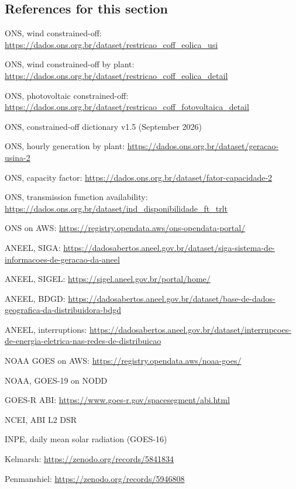 \subsection*{References for this section}
{\small
\begin{enumerate}[label={[\arabic*]},leftmargin=2.2em,itemsep=1pt]
\item ONS, wind constrained-off: \url{https://dados.ons.org.br/dataset/restricao_coff_eolica_usi}
\item ONS, wind constrained-off by plant: \url{https://dados.ons.org.br/dataset/restricao_coff_eolica_detail}
\item ONS, photovoltaic constrained-off: \url{https://dados.ons.org.br/dataset/restricao_coff_fotovoltaica_detail}
\item ONS, constrained-off dictionary v1.5 (September 2026)
\item ONS, hourly generation by plant: \url{https://dados.ons.org.br/dataset/geracao-usina-2}
\item ONS, capacity factor: \url{https://dados.ons.org.br/dataset/fator-capacidade-2}
\item ONS, transmission function availability: \url{https://dados.ons.org.br/dataset/ind_disponibilidade_ft_trlt}
\item ONS on AWS: \url{https://registry.opendata.aws/ons-opendata-portal/}
\item ANEEL, SIGA: \url{https://dadosabertos.aneel.gov.br/dataset/siga-sistema-de-informacoes-de-geracao-da-aneel}
\item ANEEL, SIGEL: \url{https://sigel.aneel.gov.br/portal/home/}
\item ANEEL, BDGD: \url{https://dadosabertos.aneel.gov.br/dataset/base-de-dados-geografica-da-distribuidora-bdgd}
\item ANEEL, interruptions: \url{https://dadosabertos.aneel.gov.br/dataset/interrupcoes-de-energia-eletrica-nas-redes-de-distribuicao}
\item NOAA GOES on AWS: \url{https://registry.opendata.aws/noaa-goes/}
\item NOAA, GOES-19 on NODD
\item GOES-R ABI: \url{https://www.goes-r.gov/spacesegment/abi.html}
\item NCEI, ABI L2 DSR
\item INPE, daily mean solar radiation (GOES-16)
\item Kelmarsh: \url{https://zenodo.org/records/5841834}
\item Penmanshiel: \url{https://zenodo.org/records/5946808}

\end{enumerate}}
